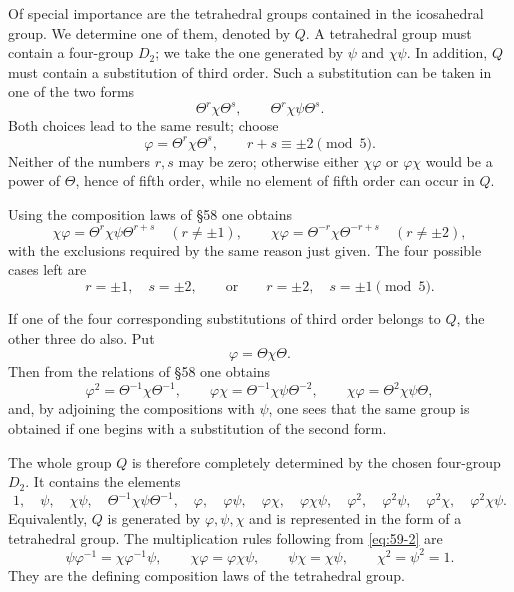 \documentclass[11pt]{article}
\begin{document}
Of special importance are the tetrahedral groups contained in the icosahedral group.  We determine one of them, denoted by \(Q\).  A tetrahedral group must contain a four-group \(D_2\); we take the one generated by \(\psi\) and \(\chi\psi\).  In addition, \(Q\) must contain a substitution of third order.  Such a substitution can be taken in one of the two forms
\[
 \Theta^r\chi\Theta^s,
 \qquad \Theta^r\chi\psi\Theta^s.
\]
Both choices lead to the same result; choose
\begin{equation}\label{eq:59-1}
 \varphi=\Theta^r\chi\Theta^s,
 \qquad r+s\equiv\pm2\pmod5.
\end{equation}
Neither of the numbers \(r,s\) may be zero; otherwise either \(\chi\varphi\) or \(\varphi\chi\) would be a power of \(\Theta\), hence of fifth order, while no element of fifth order can occur in \(Q\).

Using the composition laws of \S 58 one obtains
\[
 \chi\varphi=\Theta^r\chi\psi\Theta^{r+s}
 \quad (r\ne\pm1),
 \qquad
 \chi\varphi=\Theta^{-r}\chi\Theta^{-r+s}
 \quad (r\ne\pm2),
\]
with the exclusions required by the same reason just given.  The four possible cases left are
\[
 r=\pm1,
 \quad s=\pm2,
 \qquad\text{or}\qquad
 r=\pm2,
 \quad s=\pm1
 \pmod5.
\]

If one of the four corresponding substitutions of third order belongs to \(Q\), the other three do also.  Put
\begin{equation}\label{eq:59-2}
 \varphi=\Theta\chi\Theta.
\end{equation}
Then from the relations of \S 58 one obtains
\begin{equation}\label{eq:59-3}
 \varphi^2=\Theta^{-1}\chi\Theta^{-1},
 \qquad
 \varphi\chi=\Theta^{-1}\chi\psi\Theta^{-2},
 \qquad
 \chi\varphi=\Theta^2\chi\psi\Theta,
\end{equation}
and, by adjoining the compositions with \(\psi\), one sees that the same group is obtained if one begins with a substitution of the second form.

The whole group \(Q\) is therefore completely determined by the chosen four-group \(D_2\).  It contains the elements
\begin{equation}\label{eq:59-4}
 1,
 \quad \psi,
 \quad \chi\psi,
 \quad \Theta^{-1}\chi\psi\Theta^{-1},
 \quad \varphi,
 \quad \varphi\psi,
 \quad \varphi\chi,
 \quad \varphi\chi\psi,
 \quad \varphi^2,
 \quad \varphi^2\psi,
 \quad \varphi^2\chi,
 \quad \varphi^2\chi\psi.
\end{equation}
Equivalently, \(Q\) is generated by \(\varphi,\psi,\chi\) and is represented in the form of a tetrahedral group.  The multiplication rules following from \eqref{eq:59-2} are
\begin{equation}\label{eq:59-5}
 \psi\varphi^{-1}=\chi\varphi^{-1}\psi,
 \qquad
 \chi\varphi=\varphi\chi\psi,
 \qquad
 \psi\chi=\chi\psi,
 \qquad
 \chi^2=\psi^2=1.
\end{equation}
They are the defining composition laws of the tetrahedral group.
\end{document}
